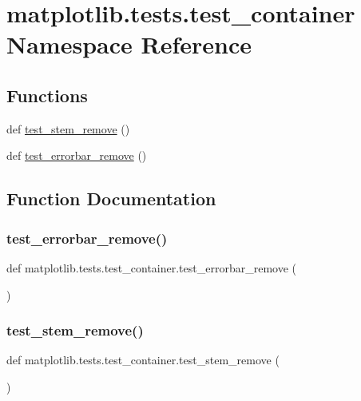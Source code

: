 \hypertarget{namespacematplotlib_1_1tests_1_1test__container}{}\section{matplotlib.\+tests.\+test\+\_\+container Namespace Reference}
\label{namespacematplotlib_1_1tests_1_1test__container}
\subsection*{Functions}
\begin{DoxyCompactItemize}
\item 
def \hyperlink{namespacematplotlib_1_1tests_1_1test__container_a59db891e0f8ab35c8a15654a83fd6917}{test\+\_\+stem\+\_\+remove} ()
\item 
def \hyperlink{namespacematplotlib_1_1tests_1_1test__container_a0d4e2b9aec79c26d5b9210e57b67cbac}{test\+\_\+errorbar\+\_\+remove} ()
\end{DoxyCompactItemize}


\subsection{Function Documentation}
\mbox{\label{namespacematplotlib_1_1tests_1_1test__container_a0d4e2b9aec79c26d5b9210e57b67cbac}} 
\subsubsection{\texorpdfstring{test\+\_\+errorbar\+\_\+remove()}{test\_errorbar\_remove()}}
{\footnotesize\ttfamily def matplotlib.\+tests.\+test\+\_\+container.\+test\+\_\+errorbar\+\_\+remove (\begin{DoxyParamCaption}{ }\end{DoxyParamCaption})}

\mbox{\label{namespacematplotlib_1_1tests_1_1test__container_a59db891e0f8ab35c8a15654a83fd6917}} 
\subsubsection{\texorpdfstring{test\+\_\+stem\+\_\+remove()}{test\_stem\_remove()}}
{\footnotesize\ttfamily def matplotlib.\+tests.\+test\+\_\+container.\+test\+\_\+stem\+\_\+remove (\begin{DoxyParamCaption}{ }\end{DoxyParamCaption})}

